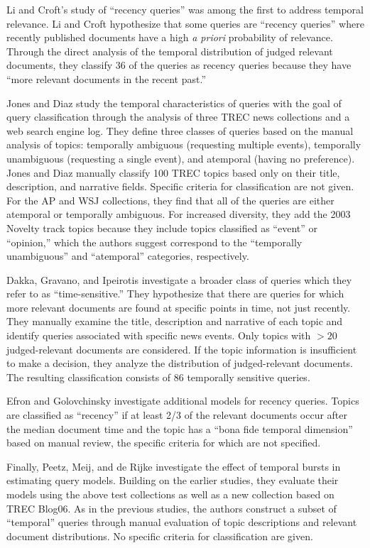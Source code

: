 \documentclass{sig-alternate}
\begin{document}
Li and Croft's study of ``recency queries''  \cite{Li2003} was among the first to address temporal relevance. Li and Croft hypothesize that some queries are ``recency queries'' where recently published documents have a high \textit{a priori} probability of relevance.  Through the direct analysis of the temporal distribution of judged relevant documents, they classify 36 of the queries as recency queries because they have ``more relevant documents in the recent past.''

Jones and Diaz \cite{Jones2007} study the temporal characteristics of queries with the goal of query classification through the analysis of three TREC news collections and a web search engine log. They define three classes of queries based on the manual analysis of topics: temporally ambiguous (requesting multiple events),  temporally unambiguous (requesting a single event), and atemporal (having no preference). Jones and Diaz manually classify 100 TREC topics based only on their title, description, and narrative fields. Specific criteria for classification are not given. For the AP and WSJ collections, they find that all of the queries are either atemporal or temporally ambiguous. For increased diversity, they add the 2003 Novelty track topics because they include topics classified as ``event'' or ``opinion,'' which the authors suggest correspond to the ``temporally unambiguous'' and ``atemporal'' categories, respectively.

Dakka, Gravano, and Ipeirotis  \cite{Dakka2012} investigate a broader class of queries which they refer to as ``time-sensitive.'' They hypothesize that there are queries for which more relevant documents are found at specific points in time, not just recently. They manually examine the title, description and narrative of each topic and identify queries associated with specific news events. Only topics with $>20$ judged-relevant documents are considered. If the topic information is insufficient to make a decision, they analyze the distribution of judged-relevant documents. The resulting classification consists of 86 temporally sensitive queries. 

Efron and Golovchinsky \cite{Efron2011} investigate additional models for recency queries.  Topics are classified as ``recency'' if at least 2/3 of the relevant documents occur after the median document time and the topic has a ``bona fide temporal dimension'' based on manual review, the specific criteria for which are not specified.  

Finally, Peetz, Meij, and de Rijke \cite{Peetz2013a} investigate the effect of temporal bursts in estimating query models. Building on the earlier studies, they evaluate their models using the above test collections as well as a new collection based on TREC Blog06. As in the previous studies, the authors construct a subset of ``temporal'' queries through manual evaluation of topic descriptions and relevant document distributions. No specific criteria for classification are given.
\end{document}
